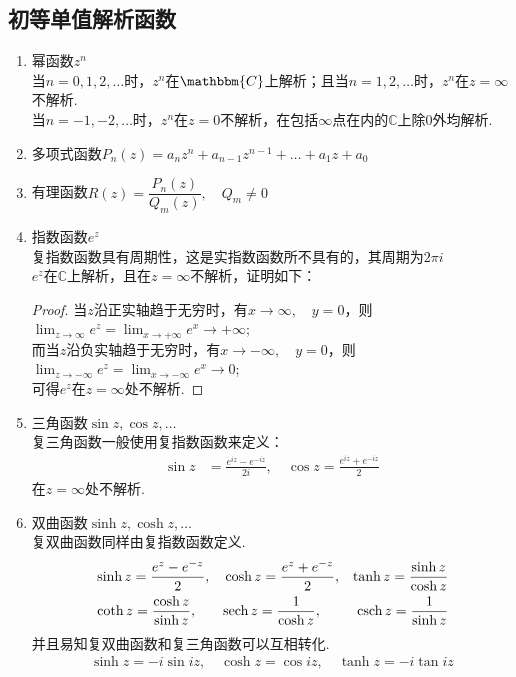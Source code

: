     \subsection{初等单值解析函数}
        \allowdisplaybreaks
        \begin{enumerate}
            \item 幂函数$z^n$\\
                当$n = 0,1,2,\dots$时，$z^n$在$\mathbbm{C}$上解析；且当$n = 1,2,\dots$时，$z^n$在$z = \infty$不解析.\\
                当$n = -1,-2,\dots$时，$z^n$在$z = 0$不解析，在包括$\infty$点在内的$\mathbb{C}$上除$0$外均解析.
            \item 多项式函数$P_n(z) = a_nz^n + a_{n-1}z^{n-1} + \dots + a_1z + a_0$
            \item 有理函数$R(z) = \dfrac{P_n(z)}{Q_m(z)}, \quad Q_m \neq 0$
            \item 指数函数$e^z$\\
                复指数函数具有周期性，这是实指数函数所不具有的，其周期为$2 \pi i$\\
                $e^z$在$\mathbb{C}$上解析，且在$z = \infty$不解析，证明如下：
                \begin{proof}
                    当$z$沿正实轴趋于无穷时，有$x \to \infty, \quad y = 0$，则$\lim_{z \to \infty}e^z = \lim_{x \to +\infty}e^x \to +\infty$;\\
                    而当$z$沿负实轴趋于无穷时，有$x \to -\infty, \quad y = 0$，则$\lim_{z \to -\infty}e^z = \lim_{x \to -\infty}e^x \to 0$;\\
                    可得$e^z$在$z = \infty$处不解析.
                \end{proof}
            \item 三角函数$\sin{z}, \cos{z}, \dots$\\
                复三角函数一般使用复指数函数来定义：
                \begin{align*}
                    \sin{z} &= \frac{e^{iz} - e^{-iz}}{2i}, \quad \cos{z} = \frac{e^{iz} + e^{-iz}}{2}
                \end{align*}
                在$z = \infty$处不解析.
            \item 双曲函数$\sinh{z}, \cosh{z}, \dots$\\
                复双曲函数同样由复指数函数定义.
                \begin{align*}
                    & \sinh{z} = \frac{e^z - e^{-z}}{2},& &\cosh{z} = \frac{e^z + e^{-z}}{2}, & \tanh{z} = \frac{\sinh{z}}{\cosh{z}}&\\
                    & \coth{z} = \frac{\cosh{z}}{\sinh{z}},& &\textnormal{sech}\,z = \frac{1}{\cosh{z}}, & \textnormal{csch}\,z = \frac{1}{\sinh{z}}&
                \end{align*}
                并且易知复双曲函数和复三角函数可以互相转化.
                \begin{align*}
                    \sinh{z} = -i\sin{iz}, \quad \cosh{z} = \cos{iz}, \quad \tanh{z} = -i\tan{iz}
                \end{align*}
        \end{enumerate}


